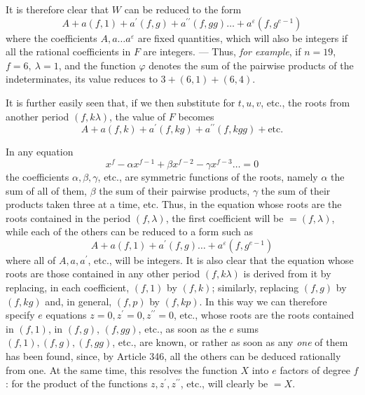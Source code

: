 It is therefore clear that \(W\) can be reduced to the form
\[A+a(f,1)+a^{\prime}(f,g)+a^{\prime\prime}(f,gg)\ldots+a^\varepsilon(f,g^{e-1})\] where the coefficients \(A,\allowbreak a\ldots a^\varepsilon\) are fixed quantities, which will also be integers if all the rational coefficients in \(F\) are integers. — Thus, \textit{for example}, if \(n=19\), \(f=6,\allowbreak \ \lambda=1\), and the function \(\varphi\) denotes the sum of the pairwise products of the indeterminates, its value reduces to \(3+(6,1)+(6,4)\).

It is further easily seen that, if we then substitute for \(t,\allowbreak u,\allowbreak v\), etc., the roots from another period \((f,k\lambda)\), the value of \(F\) becomes \[A+a(f,k)+a^{\prime}(f,kg)+a^{\prime\prime}(f,kgg)+\text{etc.}\]

In any equation \[x^f-\alpha x^{f-1}+\beta x^{f-2}-\gamma x^{f-3}\ldots=0\] the coefficients \(\alpha,\allowbreak \beta,\allowbreak \gamma\), etc., are symmetric functions of the roots, namely \(\alpha\) the sum of all of them, \(\beta\) the sum of their pairwise products, \(\gamma\) the sum of their products taken three at a time, etc. Thus, in the equation whose roots are the roots contained in the period \((f,\lambda)\), the first coefficient will be \(=(f,\lambda)\), while each of the others can be reduced to a form such as \[A+a(f,1)+a^{\prime}(f,g)\ldots+a^\varepsilon(f,g^{e-1})\] where all of \(A,\allowbreak a,\allowbreak a^{\prime}\), etc., will be integers. It is also clear that the equation whose roots are those contained in any other period \((f,k\lambda)\) is derived from it by replacing, in each coefficient, \((f,1)\) by \((f,k)\); similarly, replacing \((f,g)\) by \((f,kg)\) and, in general, \((f,p)\) by \((f,kp)\). In this way we can therefore specify \(e\) equations \(z=0,\allowbreak z^{\prime}=0,\allowbreak z^{\prime\prime}=0\), etc., whose roots are the roots contained in \((f,1)\), in \((f,g)\), \((f,gg)\), etc., as soon as the \(e\) sums \((f,1),\allowbreak (f,g),\allowbreak (f,gg)\), etc., are known, or rather as soon as any \textit{one} of them has been found, since, by Article 346, all the others can be deduced rationally from one. At the same time, this resolves the function \(X\) into \(e\) factors of degree \(f\): for the product of the functions \(z,\allowbreak z^{\prime},\allowbreak z^{\prime\prime}\), etc., will clearly be \(=X\).

